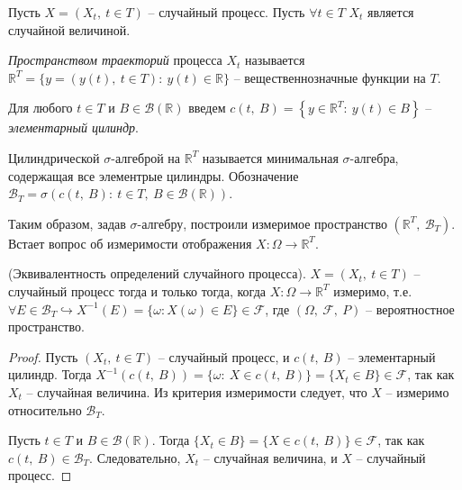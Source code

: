 Пусть $\displaystyle X=( X_{t} ,\ t\in T)$ -- случайный процесс. Пусть $\displaystyle \forall t\in T$ $\displaystyle X_{t}$ является случайной величиной.
\begin{definition}
\textit{Пространством траекторий} процесса $\displaystyle X_{t}$ называется $\displaystyle \mathbb{R}^{T} =\{y=( y( t) ,\ t\in T) :\ y( t) \in \mathbb{R}\}$ -- вещественнозначные функции на $\displaystyle T$.
\end{definition}
\begin{definition}
Для любого $\displaystyle t\in T$ и $\displaystyle B\in \mathcal{B}(\mathbb{R})$ введем $\displaystyle c( t,\ B) =\left\{y\in \mathbb{R}^{T} :\ y( t) \in B\right\}$ -- \textit{элементарный цилиндр}.
\end{definition}
\begin{definition}
Цилиндрической $\displaystyle \sigma $-алгеброй на $\displaystyle \mathbb{R}^{T}$ называется минимальная $\displaystyle \sigma $-алгебра, содержащая все элементрые цилиндры. Обозначение $\displaystyle \mathcal{B}_{T} =\sigma ( c( t,\ B) :\ t\in T,\ B\in \mathcal{B}(\mathbb{R}))$.
\end{definition}
\begin{note}
Таким образом, задав $\displaystyle \sigma $-алгебру, построили измеримое пространство $\displaystyle \left(\mathbb{R}^{T} ,\ \mathcal{B}_{T}\right)$. Встает вопрос об измеримости отображения $\displaystyle X:\Omega \rightarrow \mathbb{R}^{T}$.
\end{note}
\begin{lemma}
(Эквивалентность определений случайного процесса). $\displaystyle X=( X_{t} ,\ t\in T)$ -- случайный процесс тогда и только тогда, когда $\displaystyle X:\Omega \rightarrow \mathbb{R}^{T}$ измеримо, т.е. $\displaystyle \forall E\in \mathcal{B}_{T} \hookrightarrow X^{-1}( E) =\{\omega :X( \omega ) \in E\} \in \mathcal{F}$, где $\displaystyle ( \Omega ,\ \mathcal{F} ,\ P)$ -- вероятностное пространство.
\end{lemma}
\begin{proof}
Пусть $\displaystyle ( X_{t} ,\ t\in T)$ -- случайный процесс, и $\displaystyle c( t,\ B)$ -- элементарный цилиндр. Тогда $\displaystyle X^{-1}( c( t,\ B)) =\{\omega :\ X\in c( t,\ B)\} =\{X_{t} \in B\} \in \mathcal{F}$, так как $\displaystyle X_{t}$ -- случайная величина. Из критерия измеримости следует, что $\displaystyle X$ -- измеримо относительно $\displaystyle \mathcal{B}_{T}$.

Пусть $\displaystyle t\in T$ и $\displaystyle B\in \mathcal{B}(\mathbb{R})$. Тогда $\displaystyle \{X_{t} \in B\} =\{X\in c( t,\ B)\} \in \mathcal{F}$, так как $\displaystyle c( t,\ B) \in \mathcal{B}_{T}$. Следовательно, $\displaystyle X_{t}$ -- случайная величина, и $\displaystyle X$ -- случайный процесс.
\end{proof}
